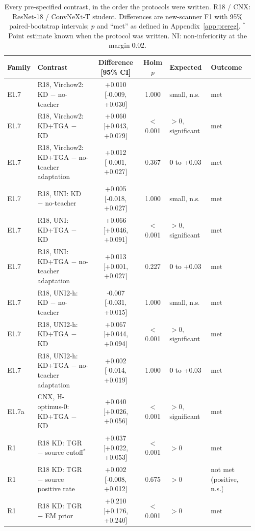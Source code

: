 \begin{table}[htbp]
{\caption{Every pre-specified contrast, in the order the protocols were written. R18 / CNX: ResNet-18 / ConvNeXt-T student. Differences are new-scanner F1 with 95\% paired-bootstrap intervals; $p$ and ``met'' as defined in Appendix~\ref{app:prereg}. $^\ast$Point estimate known when the protocol was written. NI: non-inferiority at the margin 0.02.}}
{%
\tiny
\renewcommand{\arraystretch}{0.92}
\setlength{\tabcolsep}{2.5pt}
\begin{tabular}{@{}l>{\raggedright\arraybackslash}p{5.0cm}ccp{1.8cm}>{\raggedright\arraybackslash}p{2.4cm}@{}}
\toprule
Family & Contrast & Difference [95\% CI] & Holm $p$ & Expected & Outcome \\
\midrule
E1.7 & R18, Virchow2: KD $-$ no-teacher & +0.010 [-0.009, +0.030] & 1.000 & small, n.s. & met \\
E1.7 & R18, Virchow2: KD+TGA $-$ KD & +0.060 [+0.043, +0.079] & $<$0.001 & $>0$, significant & met \\
E1.7 & R18, Virchow2: KD+TGA $-$ no-teacher adaptation & +0.012 [-0.001, +0.027] & 0.367 & 0 to +0.03 & met \\
E1.7 & R18, UNI: KD $-$ no-teacher & +0.005 [-0.018, +0.027] & 1.000 & small, n.s. & met \\
E1.7 & R18, UNI: KD+TGA $-$ KD & +0.066 [+0.046, +0.091] & $<$0.001 & $>0$, significant & met \\
E1.7 & R18, UNI: KD+TGA $-$ no-teacher adaptation & +0.013 [+0.001, +0.027] & 0.227 & 0 to +0.03 & met \\
E1.7 & R18, UNI2-h: KD $-$ no-teacher & -0.007 [-0.031, +0.015] & 1.000 & small, n.s. & met \\
E1.7 & R18, UNI2-h: KD+TGA $-$ KD & +0.067 [+0.044, +0.094] & $<$0.001 & $>0$, significant & met \\
E1.7 & R18, UNI2-h: KD+TGA $-$ no-teacher adaptation & +0.002 [-0.014, +0.019] & 1.000 & 0 to +0.03 & met \\
E1.7a & CNX, H-optimus-0: KD+TGA $-$ KD & +0.040 [+0.026, +0.056] & $<$0.001 & $>0$, significant & met \\
R1 & R18 KD: TGR $-$ source cutoff$^\ast$ & +0.037 [+0.022, +0.053] & $<$0.001 & $>0$ & met \\
R1 & R18 KD: TGR $-$ source positive rate & +0.002 [-0.008, +0.012] & 0.675 & $>0$ & not met (positive, n.s.) \\
R1 & R18 KD: TGR $-$ EM prior & +0.210 [+0.176, +0.240] & $<$0.001 & $>0$ & met \\

\end{tabular}}
\end{table}
